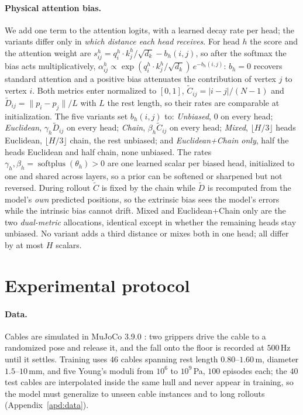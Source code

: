 \documentclass[mlabstract,onecolumn]{jmlr}
\begin{document}
\paragraph{Physical attention bias.}
We add one term to the attention logits, with a learned decay rate per head;
the variants differ only in \emph{which distance each head receives}.
For head $h$ the score and the attention weight are
$s^h_{ij}=q_i^h\!\cdot k_j^h/\sqrt{d_k}-b_h(i,j)$, so after the softmax the
bias acts multiplicatively,
$\alpha^h_{ij}\propto\exp(q_i^h\!\cdot k_j^h/\sqrt{d_k})\,e^{-b_h(i,j)}$:
$b_h{=}0$ recovers standard attention and a positive bias attenuates the
contribution of vertex $j$ to vertex $i$. Both metrics enter normalized to
$[0,1]$, $\widetilde C_{ij}=|i-j|/(N-1)$ and
$\widetilde D_{ij}=\|p_i-p_j\|/L$ with $L$ the rest length, so their rates are
comparable at initialization. The five variants set $b_h(i,j)$ to:
\emph{Unbiased}, $0$ on every head; \emph{Euclidean},
$\gamma_h\widetilde D_{ij}$ on every head; \emph{Chain},
$\beta_h\widetilde C_{ij}$ on every head; \emph{Mixed}, $\lfloor H/3\rfloor$
heads Euclidean, $\lfloor H/3\rfloor$ chain, the rest unbiased; and
\emph{Euclidean+Chain only}, half the heads Euclidean and half chain, none
unbiased. The rates $\gamma_h,\beta_h=\operatorname{softplus}(\theta_h)>0$ are
one learned scalar per biased head, initialized to one and shared across
layers, so a prior can be softened or sharpened but not reversed.
During rollout $\widetilde C$ is fixed by the chain while $\widetilde D$ is
recomputed from the model's \emph{own} predicted positions, so the extrinsic
bias sees the model's errors while the intrinsic bias cannot drift. Mixed and
Euclidean+Chain only are the two \emph{dual-metric} allocations, identical
except in whether the remaining heads stay unbiased. No variant adds a third distance or mixes both in one head; all differ by at most $H$ scalars.

\section{Experimental protocol}
\label{sec:protocol}

\paragraph{Data.}
Cables are simulated in MuJoCo 3.9.0 \citep{todorov2012mujoco}: two grippers
drive the cable to a randomized pose and release it, and the fall onto the
floor is recorded at $500$\,Hz until it settles. Training
uses $46$ cables spanning rest length $0.80$--$1.60$\,m, diameter
$1.5$--$10$\,mm, and five Young's moduli from $10^{6}$ to $10^{9}$\,Pa, $100$
episodes each; the $40$ test cables are interpolated inside the same hull and
never appear in training, so the model must generalize to unseen cable
instances and to long rollouts (Appendix~\ref{apd:data}).
\end{document}
